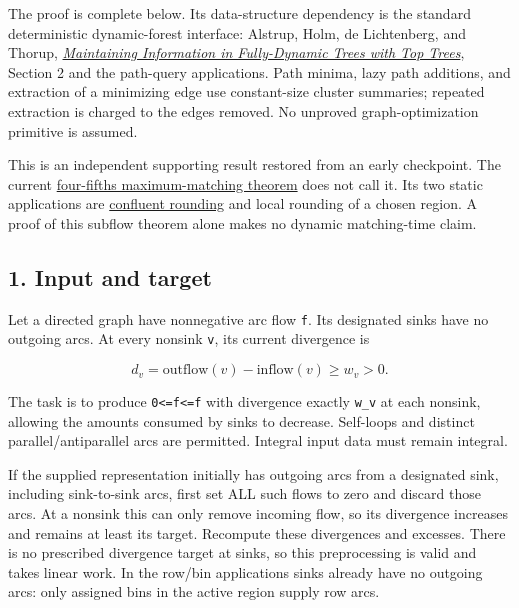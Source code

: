 The proof is complete below. Its data-structure dependency is the standard deterministic dynamic-forest interface: Alstrup, Holm, de Lichtenberg, and Thorup, \href{https://arxiv.org/abs/cs/0310065}{\emph{Maintaining Information in Fully-Dynamic Trees with Top Trees}}, Section 2 and the path-query applications. Path minima, lazy path additions, and extraction of a minimizing edge use constant-size cluster summaries; repeated extraction is charged to the edges removed. No unproved graph-optimization primitive is assumed.

This is an independent supporting result restored from an early checkpoint. The current \href{https://github.com/icekylinx/algorithm-frontier/blob/main/problems/general-matching/proof.md}{four-fifths maximum-matching theorem} does not call it. Its two static applications are \href{https://github.com/icekylinx/algorithm-frontier/blob/main/manuscripts/graph-backends/static-confluent-rounding-and-tail-bounds.md}{confluent rounding} and local rounding of a chosen region. A proof of this subflow theorem alone makes no dynamic matching-time claim.

\hypertarget{af-32c0fc642d-input-and-target}{%
\subsection{1. Input and target}\label{af-32c0fc642d-input-and-target}}

Let a directed graph have nonnegative arc flow \texttt{f}. Its designated sinks have no outgoing arcs. At every nonsink \texttt{v}, its current divergence is

\[
d_v=\mathrm{outflow}(v)-\mathrm{inflow}(v)\ge w_v>0.
\]

The task is to produce \texttt{0\textless{}=f\textquotesingle{}\textless{}=f} with divergence exactly \texttt{w\_v} at each nonsink, allowing the amounts consumed by sinks to decrease. Self-loops and distinct parallel/antiparallel arcs are permitted. Integral input data must remain integral.

If the supplied representation initially has outgoing arcs from a designated sink, including sink-to-sink arcs, first set ALL such flows to zero and discard those arcs. At a nonsink this can only remove incoming flow, so its divergence increases and remains at least its target. Recompute these divergences and excesses. There is no prescribed divergence target at sinks, so this preprocessing is valid and takes linear work. In the row/bin applications sinks already have no outgoing arcs: only assigned bins in the active region supply row arcs.

